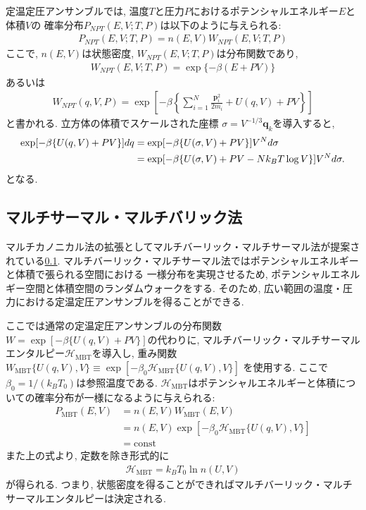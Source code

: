 定温定圧アンサンブルでは, 温度$T$と圧力$P$におけるポテンシャルエネルギー$E$と体積$V$の
確率分布$P_{NPT}(E, V; T, P)$は以下のように与えられる:
\begin{align}
  P_{NPT} (E, V; T, P) 
=
  n(E, V) W_{NPT} (E, V; T, P)
\end{align}
ここで, $n(E, V)$は状態密度, $W_{NPT}(E, V; T, P)$は分布関数であり,
\begin{align}
  W_{NPT} (E, V; T, P)
=
  \exp\{-\beta(E+PV) \}
\end{align}
あるいは
\begin{align}
  W_{NPT} (q, V, P)
=
  \exp
  \left[-\beta 
         \left\{ 
                 \sum_{i=1}^{N} \frac{\mathbf{p}_{i}^{2}}{2 m_{i}}
                + U(q, V) + PV
         \right\} 
  \right]
\end{align}
と書かれる.
立方体の体積でスケールされた座標 $\sigma = V^{-1/3} \mathbf{q}_{k}$を導入すると,
 \begin{align}
  \exp[-\beta\{U(q, V) + PV\}] dq
 &=
  \exp[-\beta\{U(\sigma, V) + PV\}] V^{N} d\sigma
 \notag
 \\
 &=
  \exp[-\beta \{U(\sigma, V) + PV -Nk_{B}T \log V \}] V^{N} d\sigma .
 \end{align}
となる.


\subsection{マルチサーマル・マルチバリック法}
マルチカノニカル法の拡張としてマルチバーリック・マルチサーマル法が提案されている\ref{}.
マルチバーリック・マルチサーマル法ではポテンシャルエネルギーと体積で張られる空間における
一様分布を実現させるため, ポテンシャルエネルギー空間と体積空間のランダムウォークをする.
そのため, 広い範囲の温度・圧力における定温定圧アンサンブルを得ることができる.

ここでは通常の定温定圧アンサンブルの分布関数$W = \exp[-\beta\{U(q,V) +PV\}]$の代わりに,
マルチバーリック・マルチサーマルエンタルピー$\mathcal{H}_{\mathrm{MBT}}$を導入し, 重み関数
$W_{\mathrm{MBT}} \{U(q,V), V\} \equiv  \exp [ -\beta_{0} \mathcal{H}_{\mathrm{MBT}} \{U(q,V), V\}]$
を使用する. ここで$\beta_{0} = 1/(k_{B} T_{0})$は参照温度である.
$\mathcal{H}_{\mathrm{MBT}}$はポテンシャルエネルギーと体積についての確率分布が一様になるように与えられる:
\begin{align}
  P_{\mathrm{MBT}} (E, V)
&=
  n(E, V) W_{\mathrm{MBT}} (E, V)
\\
&=
   n(E, V) \exp [ -\beta_{0} \mathcal{H}_{\mathrm{MBT}} \{U(q,V), V\}]
\\
&= \mathrm{const}
\end{align}
また上の式より, 定数を除き形式的に
\begin{align}
 \mathcal{H}_{\mathrm{MBT}}
=
 k_{B} T_{0} \ln n(U, V)
\end{align}
が得られる. つまり, 状態密度を得ることができればマルチバーリック・マルチサーマルエンタルピーは決定される.
